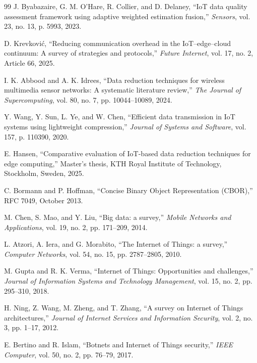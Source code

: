 \documentclass[10pt,twocolumn]{article}
\begin{document}
\begin{thebibliography}{99}
 J. Byabazaire, G. M. O'Hare, R. Collier, and D. Delaney, ``IoT data quality assessment framework using adaptive weighted estimation fusion,'' \textit{Sensors}, vol. 23, no. 13, p. 5993, 2023.

 D. Krevković, ``Reducing communication overhead in the IoT--edge--cloud continuum: A survey of strategies and protocols,'' \textit{Future Internet}, vol. 17, no. 2, Article 66, 2025.

 I. K. Abbood and A. K. Idrees, ``Data reduction techniques for wireless multimedia sensor networks: A systematic literature review,'' \textit{The Journal of Supercomputing}, vol. 80, no. 7, pp. 10044--10089, 2024.

 Y. Wang, Y. Sun, L. Ye, and W. Chen, ``Efficient data transmission in IoT systems using lightweight compression,'' \textit{Journal of Systems and Software}, vol. 157, p. 110390, 2020.

 E. Hansen, ``Comparative evaluation of IoT-based data reduction techniques for edge computing,'' Master's thesis, KTH Royal Institute of Technology, Stockholm, Sweden, 2025.

 C. Bormann and P. Hoffman, ``Concise Binary Object Representation (CBOR),'' RFC 7049, October 2013.

 M. Chen, S. Mao, and Y. Liu, ``Big data: a survey,'' \textit{Mobile Networks and Applications}, vol. 19, no. 2, pp. 171--209, 2014.

 L. Atzori, A. Iera, and G. Morabito, ``The Internet of Things: a survey,'' \textit{Computer Networks}, vol. 54, no. 15, pp. 2787--2805, 2010.

 M. Gupta and R. K. Verma, ``Internet of Things: Opportunities and challenges,'' \textit{Journal of Information Systems and Technology Management}, vol. 15, no. 2, pp. 295--310, 2018.

 H. Ning, Z. Wang, M. Zheng, and T. Zhang, ``A survey on Internet of Things architectures,'' \textit{Journal of Internet Services and Information Security}, vol. 2, no. 3, pp. 1--17, 2012.

 E. Bertino and R. Islam, ``Botnets and Internet of Things security,'' \textit{IEEE Computer}, vol. 50, no. 2, pp. 76--79, 2017.

\end{thebibliography}
\end{document}
